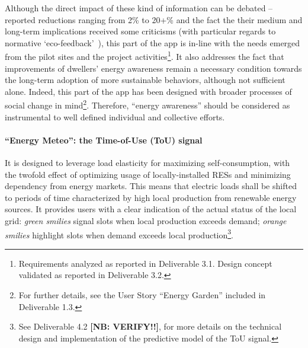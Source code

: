 Although the direct impact of these kind of information can be debated -- reported reductions ranging from 2\% to 20+\% \citep{eea_report} and the fact the their medium and
long-term implications received some criticisms (with particular regards to normative `eco-feedback'~\citep{Strengers2012,Cakici2014}), this part of the app is in-line with the needs emerged from
the pilot sites and the project activities\footnote{Requirements analyzed as reported in Deliverable 3.1. Design concept validated as reported in Deliverable 3.2.}.
It also addresses the fact that improvements of dwellers' energy awareness remain a necessary condition towards the long-term adoption of more sustainable behaviors,
although not sufficient alone. Indeed, this part of the app has been designed with broader processes of social change
in mind\footnote{For further details, see the User Story ``Energy Garden'' included in Deliverable 1.3.}. Therefore, ``energy awareness'' should be considered as instrumental to
well defined individual and collective efforts. 


\paragraph{``Energy Meteo'': the Time-of-Use (ToU) signal} 
It is designed to leverage load elasticity for maximizing self-consumption, with the twofold effect of optimizing usage of locally-installed RESs and minimizing dependency from energy markets. This means that electric loads shall be shifted to periods of time characterized by high local production from renewable energy sources.
It provides users with a clear indication of the actual status of the local grid: \textit{green smilies} signal slots when local production exceeds demand; \textit{orange smilies} highlight slots
when demand exceeds local production\footnote{See Deliverable 4.2 \textbf{[NB: VERIFY!!]}, for more details on the technical design and implementation of the predictive model of the ToU signal.}.

